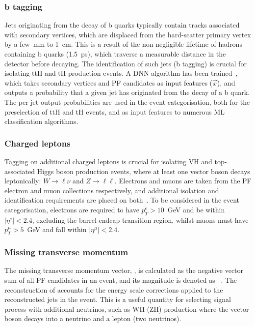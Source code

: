 \subsubsection{b tagging}
Jets originating from the decay of b quarks typically contain tracks associated with secondary vertices, which are displaced from the hard-scatter primary vertex by a few~mm to 1~cm. This is a result of the non-negligible lifetime of hadrons containing b quarks (1.5~ps), which traverse a measurable distance in the detector before decaying. The identification of such jets (b tagging) is crucial for isolating ttH and tH production events. A DNN algorithm has been trained~\cite{Sirunyan:2017ezt}, which takes secondary vertices and PF candidates as input features ($\vec{x}$), and outputs a probability that a given jet has originated from the decay of a b quark. The per-jet output probabilities are used in the event categorisation, both for the preselection of ttH and tH events, and as input features to numerous ML classification algorithms.

\subsubsection{Charged leptons}
Tagging on additional charged leptons is crucial for isolating VH and top-associated Higgs boson production events, where at least one vector boson decays leptonically: $W\rightarrow\ell\nu$ and $Z\rightarrow\ell\ell$. Electrons and muons are taken from the PF electron and muon collections respectively, and additional isolation and identification requirements are placed on both~\cite{Khachatryan:2015hwa,Sirunyan:2018fpa}. To be considered in the event categorisation, electrons are required to have $p_T^e>10$~GeV and be within $|\eta^e|<2.4$, excluding the barrel-endcap transition region, whilst muons must have $p_T^\mu>5$~GeV and fall within $|\eta^\mu|<2.4$.

\subsubsection{Missing transverse momentum}
The missing transverse momentum vector, \metv, is calculated as the negative vector \pt sum of all PF candidates in an event, and its magnitude is denoted as \met~\cite{Sirunyan:2019kia}. The reconstruction of \metv accounts for the energy scale corrections applied to the reconstructed jets in the event. This is a useful quantity for selecting signal process with additional neutrinos, such as WH (ZH) production where the vector boson decays into a neutrino and a lepton (two neutrinos).

